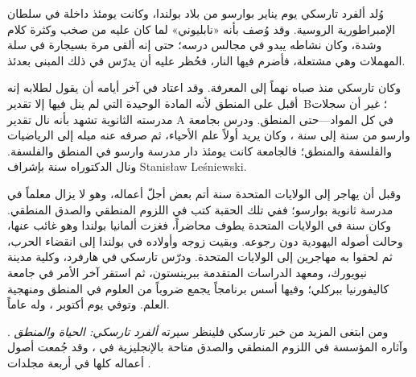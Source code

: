 \documentclass[../../../include/open-logic-section]{subfiles}
\begin{document}



وُلد ألفرد تارسكي يوم  يناير  بوارسو من بلاد بولندا، وكانت يومئذ
داخلة في سلطان الإمبراطورية الروسية. وقد وُصف بأنه «نابليوني» لما كان
عليه من صخب وكثرة كلام وشدة، وكان نشاطه يبدو في مجالس درسه؛ حتى إنه ألقى
مرة بسيجارة في سلة المهملات وهي مشتعلة، فأضرم فيها النار، فحُظر عليه أن
يدرّس في ذلك المبنى بعدئذ.

وكان تارسكي منذ صباه نهماً إلى المعرفة. وقد اعتاد في آخر أيامه أن يقول
لطلابه إنه أقبل على المنطق لأنه المادة الوحيدة التي لم ينل فيها إلا
تقدير~B؛ غير أن سجلات مدرسته الثانوية تشهد بأنه نال تقدير A في كل
المواد---حتى المنطق. ودرس بجامعة وارسو من سنة  إلى سنة ، وكان
يريد أولاً علم الأحياء، ثم صرفه عنه ميله إلى الرياضيات والفلسفة والمنطق؛
فالجامعة كانت يومئذ دار مدرسة وارسو في المنطق والفلسفة. ونال الدكتوراه سنة
 بإشراف Stanis\l{}aw Le\'{s}niewski.

وقبل أن يهاجر إلى الولايات المتحدة سنة  أتم بعض أجلّ أعماله، وهو لا
يزال معلماً في مدرسة ثانوية بوارسو؛ ففي تلك الحقبة كتب في اللزوم المنطقي
والصدق المنطقي. وكان سنة  في الولايات المتحدة يطوف محاضراً، فغزت
ألمانيا بولندا وهو غائب عنها، وحالت أصوله اليهودية دون رجوعه. وبقيت زوجه
وأولاده في بولندا إلى انقضاء الحرب، ثم لحقوا به مهاجرين إلى الولايات
المتحدة. ودرّس تارسكي في هارفرد، وكلية مدينة نيويورك، ومعهد الدراسات
المتقدمة ببرينستون، ثم استقر آخر الأمر في جامعة كاليفورنيا ببركلي؛ وفيها
أسس برنامجاً يجمع ضروباً من العلوم في المنطق ومنهجية العلم. وتوفي يوم 
أكتوبر ، وله  عاماً.

\begin{reading}
ومن ابتغى المزيد من خبر تارسكي فلينظر سيرته \emph{ألفرد تارسكي: الحياة
والمنطق} \citep{Feferman2004}. وآثاره المؤسسة في اللزوم المنطقي والصدق
متاحة بالإنجليزية في \citep{Tarski1983}، وقد جُمعت أصول أعماله كلها في
أربعة مجلدات \citep{Tarski1981}.
\end{reading}
\end{document}
